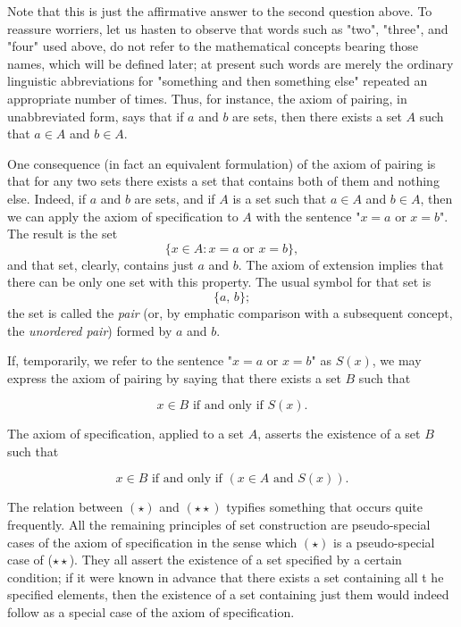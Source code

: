 Note that this is just the affirmative answer to the second question above. To reassure worriers, let us hasten to observe that words such as "two", "three", and "four" used above, do not refer to the mathematical concepts bearing those
names, which will be defined later; at present such words are merely the ordinary linguistic abbreviations for "something and then something else" repeated an appropriate number of times. Thus, for instance, the axiom of pairing, in unabbreviated form, says that if $a$ and $b$ are sets, then there exists a set $A$ such that $a \in A$ and $b \in A$.

One consequence (in fact an equivalent formulation) of the axiom of pairing is that for any two sets there exists a set that contains both of them and nothing else. Indeed, if $a$ and $b$ are sets, and if $A$ is a set such that $a \in A$ and $b \in A$, then we can apply the axiom of specification to $A$ with the sentence "$x = a \text{ or } x = b$". The
result is the set
\[
	\{ x \in A : x = a \text{ or } x = b\},
\]
and that set, clearly, contains just $a$ and $b$. The axiom of extension implies that there can be only one set with this property. The usual symbol for that set is
\[
	\{a, \, b\};
\]
the set is called the \textit{pair} (or, by emphatic comparison with a subsequent concept, the \textit{unordered pair}) formed by $a$ and $b$.

If, temporarily, we refer to the sentence "$x = a \text{ or } x = b$" as $S(x)$, we may express the axiom of pairing by saying that there exists a set $B$ such that
 
\begin{equation}
	x \in B \text{ if and only if } S(x). \tag{$\star$}
\end{equation}

The axiom of specification, applied to a set $A$, asserts the existence of a set $B$ such that

\begin{equation}
	x \in B \text{ if and only if } (x \in A \text{ and } S(x)). \tag{$\star\star$}
\end{equation}

The relation between $(\star)$ and $(\star\star)$ typifies something that occurs quite frequently. All the remaining principles of set construction are pseudo-special cases of the axiom of specification in the sense which $(\star)$ is a pseudo-special case of ($\star\star$). They all assert the existence of a set specified by a certain condition; if it were known in advance that there exists a set containing all t he specified elements, then the existence of a set containing just them would indeed follow as a special case of the axiom of specification.

